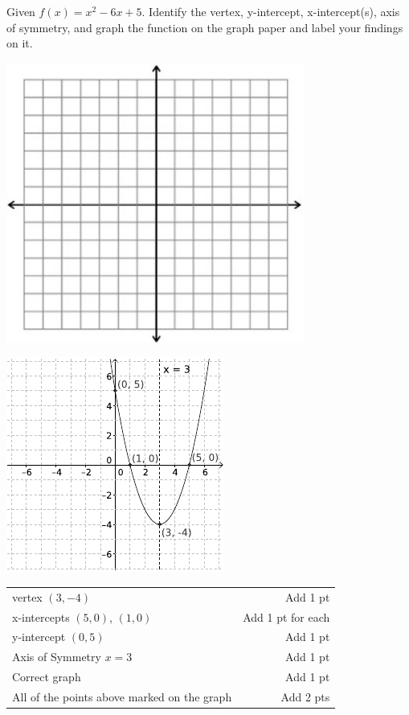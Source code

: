 {
	Given $f(x)=x^2-6x+5$. Identify the vertex, y-intercept, x-intercept(s), axis of symmetry, and graph the function on the graph paper and label your findings on it.\begin{onlyproblem}\begin{center}\includegraphics{fig-graphpaper.png}\end{center}\end{onlyproblem} \begin{onlysolution}\begin{center}\includegraphics{fig100-18-a-answer}\end{center}\end{onlysolution}
}
{
	\begin{tabular}{l r}
	vertex $(3, -4)$ & Add 1 pt\\
	x-intercepts $(5,0)$, $(1, 0)$ & Add 1 pt for each\\
	y-intercept $(0,5)$ & Add 1 pt\\
	Axis of Symmetry  $x=3$ & Add 1 pt\\
	Correct graph & Add 1 pt\\
	All of the points above marked on the graph & Add 2 pts\\
	\end{tabular}
}

